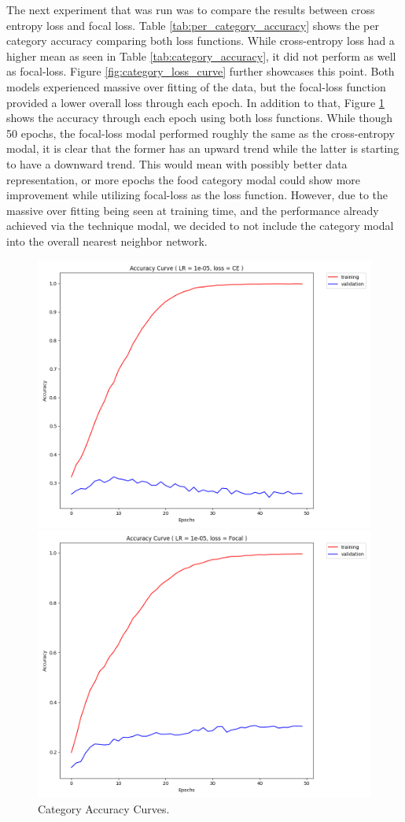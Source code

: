 \documentclass[10pt,twocolumn,letterpaper]{article}
\begin{document}
The next experiment that was run was to compare the results between cross entropy loss and focal loss. Table \ref{tab:per_category_accuracy} shows the per category accuracy comparing both loss functions. While cross-entropy loss had a higher mean as seen in Table \ref{tab:category_accuracy}, it did not perform as well as focal-loss. Figure \ref{fig:category_loss_curve} further showcases this point. Both models experienced massive over fitting of the data, but the focal-loss function provided a lower overall loss through each epoch. In addition to that, Figure \ref{fig:category_accuracy_curve} shows the accuracy through each epoch using both loss functions. While though 50 epochs, the focal-loss modal performed roughly the same as the cross-entropy modal, it is clear that the former has an upward trend while the latter is starting to have a downward trend. This would mean with possibly better data representation, or more epochs the food category modal could show more improvement while utilizing focal-loss as the loss function. However, due to the massive over fitting being seen at training time, and the performance already achieved via the technique modal, we decided to not include the category modal into the overall nearest neighbor network. 

\begin{figure}
\begin{subfigure}
    \begin{left}
    \includegraphics[width=0.45\linewidth]{lr_1e-05_e50_CE_accuracy_history}
    \end{left}
\end{subfigure}%
\begin{subfigure}
    \begin{right}
    \includegraphics[width=0.45\linewidth]{lr_1e-05_e50_Focal_accuracy_history}
    \end{right}
\end{subfigure}%
  \caption{Category Accuracy Curves.}
\label{fig:category_accuracy_curve}
\end{figure}
\end{document}
